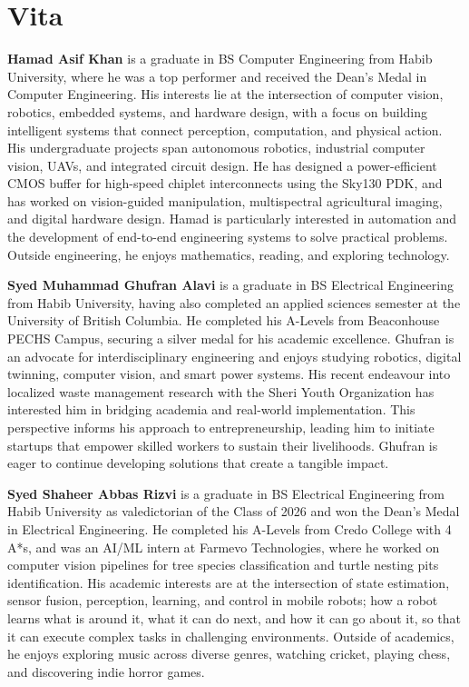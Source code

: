 \chapter*{Vita}

\textbf{Hamad Asif Khan} is a graduate in BS Computer Engineering from Habib University, where he was a top performer and received the Dean's Medal in Computer Engineering. His interests lie at the intersection of computer vision, robotics, embedded systems, and hardware design, with a focus on building intelligent systems that connect perception, computation, and physical action.
His undergraduate projects span autonomous robotics, industrial computer vision, UAVs, and integrated circuit design. He has designed a power-efficient CMOS buffer for high-speed chiplet interconnects using the Sky130 PDK, and has worked on vision-guided manipulation, multispectral agricultural imaging, and digital hardware design.
Hamad is particularly interested in automation and the development of end-to-end engineering systems to solve practical problems. Outside engineering, he enjoys mathematics, reading, and exploring technology. \newline

\textbf{Syed Muhammad Ghufran Alavi} is a graduate in BS Electrical Engineering from Habib University, having also completed an applied sciences semester at the University of British Columbia. He completed his A-Levels from Beaconhouse PECHS Campus, securing a silver medal for his academic excellence. Ghufran is an advocate for interdisciplinary engineering and enjoys studying robotics, digital twinning, computer vision, and smart power systems. His recent endeavour into localized waste management research with the Sheri Youth Organization has interested him in bridging academia and real-world implementation. This perspective informs his approach to entrepreneurship, leading him to initiate  startups that empower skilled workers to sustain their livelihoods. Ghufran is eager to continue developing solutions that create a tangible impact. \newline

\textbf{Syed Shaheer Abbas Rizvi} is a graduate in BS Electrical Engineering from Habib University as valedictorian of the Class of 2026 and won the Dean's Medal in Electrical Engineering. He completed his A-Levels from Credo College with 4 A*s, and was an AI/ML intern at Farmevo Technologies, where he worked on computer vision pipelines for tree species classification and turtle nesting pits identification. His academic interests are at the intersection of state estimation, sensor fusion, perception, learning, and control in mobile robots; how a robot learns what is around it, what it can do next, and how it can go about it, so that it can execute complex tasks in challenging environments. Outside of academics, he enjoys exploring music across diverse genres, watching cricket, playing chess, and discovering indie horror games. \newline

